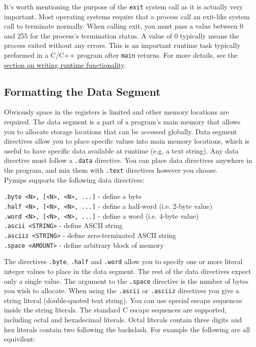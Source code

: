 \documentclass[12pt]{article}
\begin{document}
It's worth mentioning the purpose of the \texttt{exit} system call as it is
     actually very important. Most operating systems require that a process call
     an exit-like system call to terminate normally. When calling exit, you must
     pass a value between 0 and 255 for the process's termination status. A
     value of 0 typically means the process exited without any errors. This is
     an important runtime task typically preformed in a C/C++ program after
     \texttt{main} returns. For more details, see the
     \hyperref[sec:runtime]{section on writing runtime functionality}.

\subsection{Formatting the Data Segment}

Obviously space in the registers is limited and other memory locations are
     required. The data segment is a part of a program's main memory that allows
     you to allocate storage locations that can be accessed globally. Data
     segment directives allow you to place specific values into main memory
     locations, which is useful to have specific data available at runtime
     (e.g. a text string). Any data directive must follow a \texttt{.data}
     directive. You can place data directives anywhere in the program, and mix
     them with \texttt{.text} directives however you choose.\\

Pymips supports the following data directives:\\

\begin{addmargin}[0.5in]{0.5in}
    \texttt{.byte <N>, [<N>, <N>, ...]} - define a byte\\
    \texttt{.half <N>, [<N>, <N>, ...]} - define a half-word (i.e. 2-byte value)\\
    \texttt{.word <N>, [<N>, <N>, ...]} - define a word (i.e. 4-byte value)\\
    \texttt{.ascii <STRING>} - define ASCII string\\
    \texttt{.asciiz <STRING>} - define zero-terminated ASCII string\\
    \texttt{.space <AMOUNT>} - define arbitrary block of memory\\
\end{addmargin}

The directives \texttt{.byte}, \texttt{.half} and \texttt{.word} allow you to
     specify one or more literal integer values to place in the data
     segment. The rest of the data directives expect only a single value. The
     argument to the \texttt{.space} directive is the number of bytes you wish
     to allocate. When using the \texttt{.ascii} or \texttt{.asciiz} directives
     you give a string literal (double-quoted text string). You can use special
     escape sequences inside the string literals. The standard C escape
     sequences are supported, including octal and hexadecimal literals. Octal
     literals contain three digits and hex literals contain two following the
     backslash. For example the following are all equivilent:\\
\end{document}
